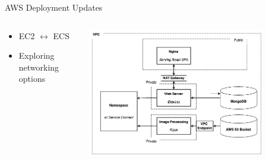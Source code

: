 \begin{frame}{AWS Deployment Updates}
    \begin{columns}
        \begin{column}{0.3\textwidth}
            \begin{itemize}
                \item EC2 $\leftrightarrow$ ECS
                \item Exploring networking options
            \end{itemize}  
        \end{column}
        \begin{column}{0.7\textwidth}
            \centering
            \includegraphics[height=0.8\textheight,width=0.8\textwidth,keepaspectratio]{images/mm_system_2.png}
        \end{column}
    \end{columns}
\end{frame}




